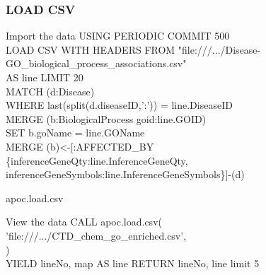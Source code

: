 \documentclass[12pt]{beamer}
\begin{document}
    \begin{frame}
        \frametitle{LOAD CSV}
        
        \begin{block}{Import the data}
            USING PERIODIC COMMIT 500\\
            LOAD CSV WITH HEADERS FROM "file:///.../Disease-GO\_biological\_process\_associations.csv"\\
            \hspace{1cm} AS line LIMIT 20\\
            MATCH (d:Disease)\\
            \hspace{1cm} WHERE last(split(d.diseaseID,':')) = line.DiseaseID\\ 
            MERGE (b:BiologicalProcess {goid:line.GOID})\\
            \hspace{1cm} SET b.goName = line.GOName\\
            MERGE (b)\textless-[:AFFECTED\_BY\\
            \hspace{2cm} \{inferenceGeneQty:line.InferenceGeneQty,\\
            \hspace{2cm} inferenceGeneSymbols:line.InferenceGeneSymbols\}]-(d)
        \end{block}
    \end{frame}

    \begin{frame}{apoc.load.csv}
        
        \begin{block}{View the data}
        CALL apoc.load.csv(\\
        \hspace{1cm}'file:///.../CTD\_chem\_go\_enriched.csv',\\
        {})\\
        YIELD lineNo, map AS line RETURN lineNo, line limit 5
        \end{block}
    \end{frame}
    
\end{document}
